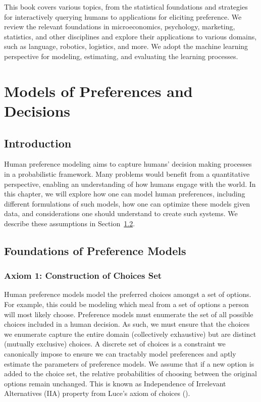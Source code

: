 \documentclass[
  letterpaper,
  numbers=noenddot,
  DIV=11]{scrreprt}
\let\oldchapter\chapter
\def\chapter{%
  \setcounter{sidenote}{1}%
  \oldchapter
}
\theoremstyle{definition}
\theoremstyle{plain}
\theoremstyle{plain}
\theoremstyle{remark}
\begin{document}
This book covers various topics, from the statistical foundations and
strategies for interactively querying humans to applications for
eliciting preference. We review the relevant foundations in
microeconomics, psychology, marketing, statistics, and other disciplines
and explore their applications to various domains, such as language,
robotics, logistics, and more. We adopt the machine learning perspective
for modeling, estimating, and evaluating the learning processes.


\chapter{Models of Preferences and
Decisions}\label{ch-human-decision-making-choice-models}

\section{Introduction}\label{introduction}

Human preference modeling aims to capture humans' decision making
processes in a probabilistic framework. Many problems would benefit from
a quantitative perspective, enabling an understanding of how humans
engage with the world. In this chapter, we will explore how one can
model human preferences, including different formulations of such
models, how one can optimize these models given data, and considerations
one should understand to create such systems. We describe these
assumptions in Section~\ref{sec-foundations}.

\section{Foundations of Preference Models}\label{sec-foundations}

\subsection*{Axiom 1: Construction of Choices
Set}\label{axiom-1-preference-models-model-choice}

Human preference models model the preferred choices amongst a set of
options. For example, this could be modeling which meal from a set of
options a person will most likely choose. Preference models must
enumerate the set of all possible choices included in a human decision.
As such, we must ensure that the choices we enumerate capture the entire
domain (collectively exhaustive) but are distinct (mutually exclusive)
choices. A discrete set of choices is a constraint we canonically impose
to ensure we can tractably model preferences and aptly estimate the
parameters of preference models. We assume that if a new option is added
to the choice set, the relative probabilities of choosing between the
original options remain unchanged. This is known as Independence of
Irrelevant Alternatives (IIA) property from Luce's axiom of choices
().
\end{document}
